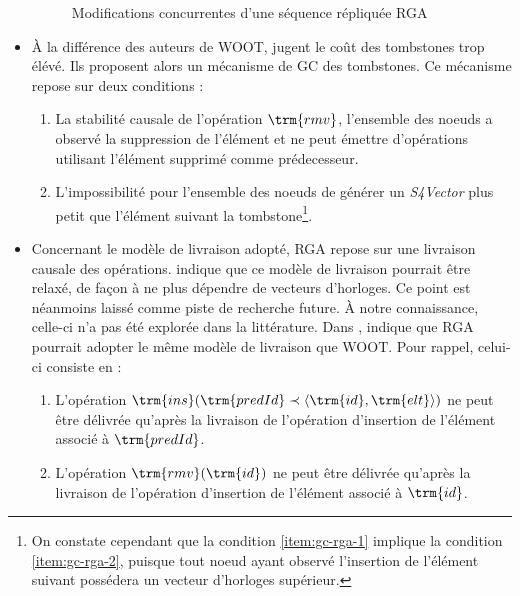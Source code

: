 \begin{itemize}
\begin{figure}[!ht]
{
      }
      \caption{Modifications concurrentes d'une séquence répliquée \ac{RGA}}
      \label{fig:rga}
    \end{figure}
  \item À la différence des auteurs de WOOT, \citeauthor{ROH2011354} jugent le coût des tombstones trop élévé.
    Ils proposent alors un mécanisme de \ac{GC} des tombstones.
    Ce mécanisme repose sur deux conditions :
    \begin{enumerate}[label=(\roman*)]
      \item \label{item:gc-rga-1}
        La stabilité causale de l'opération $\trm{rmv}$, \ie l'ensemble des noeuds a observé la suppression de l'élément et ne peut émettre d'opérations utilisant l'élément supprimé comme prédecesseur.
      \item \label{item:gc-rga-2}
        L'impossibilité pour l'ensemble des noeuds de générer un \emph{S4Vector} plus petit que l'élément suivant la tombstone\footnote{On constate cependant que la condition \ref{item:gc-rga-1} implique la condition \ref{item:gc-rga-2}, puisque tout noeud ayant observé l'insertion de l'élément suivant possédera un vecteur d'horloges supérieur.}.
    \end{enumerate}
  \item Concernant le modèle de livraison adopté, \ac{RGA} repose sur une livraison causale des opérations.
    \cite{ROH2011354} indique que ce modèle de livraison pourrait être relaxé, de façon à ne plus dépendre de vecteurs d'horloges.
    Ce point est néanmoins laissé comme piste de recherche future.
    À notre connaissance, celle-ci n'a pas été explorée dans la littérature.
    Dans \cite{2021-these-vic}, \citeauthor{2021-these-vic} indique que \ac{RGA} pourrait adopter le même modèle de livraison que WOOT.
    Pour rappel, celui-ci consiste en :
    \begin{enumerate}[label=(\roman*)]
      \item L'opération $\trm{ins}(\trm{predId} \prec \langle \trm{id},\trm{elt} \rangle)$ ne peut être délivrée qu'après la livraison de l'opération d'insertion de l'élément associé à $\trm{predId}$.
      \item L'opération $\trm{rmv}(\trm{id})$ ne peut être délivrée qu'après la livraison de l'opération d'insertion de l'élément associé à $\trm{id}$.

\end{enumerate}
\end{itemize}
